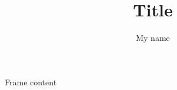 \documentclass{beamer}
\title{Title}
\author{My name}
\institute{My institute}
\begin{document}
    \begin{frame}[plain]
        \titlepage
    \end{frame}

    \begin{frame}
        Frame content
    \end{frame}
\end{document}
